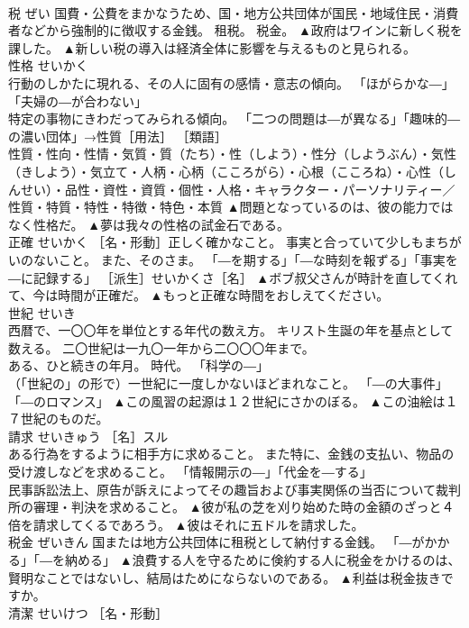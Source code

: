 \documentclass[8pt]{extreport}
\begin{document}
\begin{CJK}{UTF8}{min}
\\	税	ぜい	国費・公費をまかなうため、国・地方公共団体が国民・地域住民・消費者などから強制的に徴収する金銭。 租税。 税金。	▲政府はワインに新しく税を課した。 ▲新しい税の導入は経済全体に影響を与えるものと見られる。
\\	性格	せいかく	
\\	行動のしかたに現れる、その人に固有の感情・意志の傾向。 「ほがらかな―」「夫婦の―が合わない」 
\\	特定の事物にきわだってみられる傾向。 「二つの問題は―が異なる」「趣味的―の濃い団体」→性質［用法］ ［類語］
\\	性質・性向・性情・気質・質（たち）・性（しよう）・性分（しようぶん）・気性（きしよう）・気立て・人柄・心柄（こころがら）・心根（こころね）・心性（しんせい）・品性・資性・資質・個性・人格・キャラクター・パーソナリティー／
\\	性質・特質・特性・特徴・特色・本質	▲問題となっているのは、彼の能力ではなく性格だ。 ▲夢は我々の性格の試金石である。
\\	正確	せいかく	［名・形動］正しく確かなこと。 事実と合っていて少しもまちがいのないこと。 また、そのさま。 「―を期する」「―な時刻を報ずる」「事実を―に記録する」 ［派生］せいかくさ［名］	▲ボブ叔父さんが時計を直してくれて、今は時間が正確だ。 ▲もっと正確な時間をおしえてください。
\\	世紀	せいき	
\\	西暦で、一〇〇年を単位とする年代の数え方。 キリスト生誕の年を基点として数える。 二〇世紀は一九〇一年から二〇〇〇年まで。 
\\	ある、ひと続きの年月。 時代。 「科学の―」 
\\	（「世紀の」の形で）一世紀に一度しかないほどまれなこと。 「―の大事件」「―のロマンス」	▲この風習の起源は１２世紀にさかのぼる。 ▲この油絵は１７世紀のものだ。
\\	請求	せいきゅう	［名］スル 
\\	ある行為をするように相手方に求めること。 また特に、金銭の支払い、物品の受け渡しなどを求めること。 「情報開示の―」「代金を―する」 
\\	民事訴訟法上、原告が訴えによってその趣旨および事実関係の当否について裁判所の審理・判決を求めること。	▲彼が私の芝を刈り始めた時の金額のざっと４倍を請求してくるであろう。 ▲彼はそれに五ドルを請求した。
\\	税金	ぜいきん	国または地方公共団体に租税として納付する金銭。 「―がかかる」「―を納める」	▲浪費する人を守るために倹約する人に税金をかけるのは、賢明なことではないし、結局はためにならないのである。 ▲利益は税金抜きですか。
\\	清潔	せいけつ	［名・形動］ 

\end{CJK}
\end{document}

